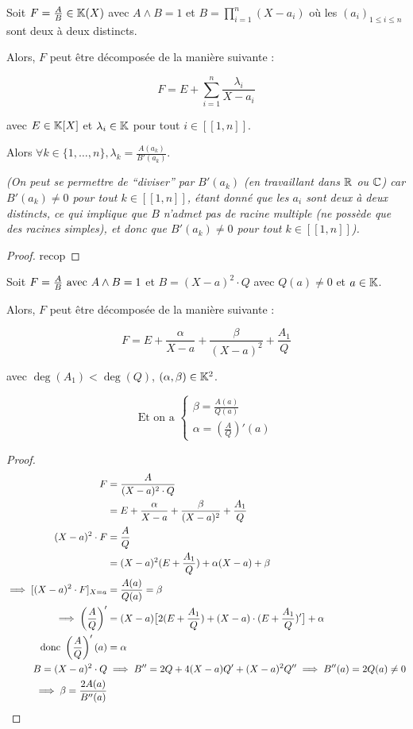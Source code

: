 \documentclass[12pt,a4paper]{report}
\begin{document}
\begin{property}
    Soit $F = \frac AB \in \mathbb{K}(X)$ avec $A\wedge B = 1$ et $B = \prod_{i=1}^n (X - a_i)$ où les $(a_i)_{1\le i \le n}$ sont deux à deux distincts.

    Alors, $F$ peut être décomposée de la manière suivante :

    $$F = E + \sum_{i=1}^{n}\frac{\lambda_i}{X - a_i}$$
    
    avec $E \in \mathbb{K}[X]$ et $\lambda_i \in \mathbb{K}$ pour tout $i \in [\![1,n]\!]$.

    Alors $\forall k \in \{1,\dots,n\}, \lambda_k = \frac{A(a_k)}{B'(a_k)}$.

    \textit{(On peut se permettre de ``diviser'' par $B'(a_k)$ (en travaillant dans $\mathbb{R}$ ou $\mathbb{C}$) car $B'(a_k) \neq 0$ pour tout $k \in [\![1,n]\!]$, étant donné que les $a_i$ sont deux à deux distincts, ce qui implique que $B$ n'admet pas de racine multiple (ne possède que des racines simples), et donc que $B'(a_k) \neq 0$ pour tout $k \in [\![1,n]\!]$).}
\end{property}

\begin{proof}
    recop
\end{proof}

\begin{property}
    Soit $F = \frac AB \text{ avec } A \wedge B = 1$ et $B = (X - a)^2 \cdot Q$ avec $Q(a) \neq 0$ et $a \in \mathbb{K}$.

    Alors, $F$ peut être décomposée de la manière suivante :

    $$F = E + \frac{\alpha}{X - a} + \frac{\beta}{(X - a)^2} + \frac{A_1}{Q}$$

    avec $\deg(A_1) < \deg(Q)$, $(\alpha,\beta) \in \mathbb{K}^2$.

    $$\text{Et on a } \begin{cases}
    \beta = \frac{A(a)}{Q(a)}\\
    \alpha = \left(\frac AQ\right)'(a)
    \end{cases}$$
\end{property}

\begin{proof}
    \begin{align*}
    F &= \frac{A}{(X - a)^2 \cdot Q}
    \\
      &= E + \frac{\alpha}{X - a} + \frac{\beta}{(X - a)^2} + \frac{A_1}{Q}
    \\
    (X - a)^2 \cdot F &= \frac AQ
    \\
      &= (X-a)^2(E+\frac{A_1}{Q}) + \alpha(X-a)+ \beta
    \\
    \implies [(X-a)^2 \cdot F]_{X=a} &= \frac{A(a)}{Q(a)} = \beta
    \\
    \implies \left(\frac AQ\right)' &= (X-a)\big[2(E+\frac{A_1}{Q}) + (X-a)\cdot(E+\frac{A_1}{Q})'\big]+\alpha
    \\
    \text{ donc } \left(\frac AQ\right)'(a) &= \alpha
    \\
    B = (X-a)^2 \cdot Q &\implies B'' = 2Q + 4(X-a)Q' + (X-a)^2 Q'' \implies B''(a) = 2Q(a) \neq 0
    \\
    \implies \beta = \frac{2A(a)}{B''(a)}
    \end{align*}
\end{proof}
\end{document}
